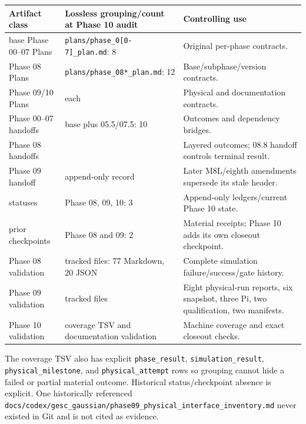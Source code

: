 \documentclass[
  10pt,
  letterpaper,
]{article}
\newcounter{none} %
\begin{document}
{\def\LTcaptype{none} %
\begin{longtable}[]{@{}
  >{\raggedright\arraybackslash}p{}
  >{\raggedleft\arraybackslash}p{}
  >{\raggedright\arraybackslash}p{}@{}}
\toprule\noalign{}
\begin{minipage}[b]{\linewidth}\raggedright
Artifact class
\end{minipage} & \begin{minipage}[b]{\linewidth}\raggedleft
Lossless grouping/count at Phase 10 audit
\end{minipage} & \begin{minipage}[b]{\linewidth}\raggedright
Controlling use
\end{minipage} \\
\midrule\noalign{}
\endhead
\bottomrule\noalign{}
\endlastfoot
base Phase 00--07 Plans & \nolinkurl{plans/phase\_0[0-7]\_plan.md}: 8 & Original per-phase contracts. \\
Phase 08 Plans & \nolinkurl{plans/phase\_08*\_plan.md}: 12 & Base/subphase/version contracts. \\
Phase 09/10 Plans & 1 each & Physical and documentation contracts. \\
Phase 00--07 handoffs & base plus 05.5/07.5: 10 & Outcomes and dependency bridges. \\
Phase 08 handoffs & 9 & Layered outcomes; 08.8 handoff controls terminal result. \\
Phase 09 handoff & 1 append-only record & Later M8L/eighth amendments supersede its stale header. \\
statuses & Phase 08, 09, 10: 3 & Append-only ledgers/current Phase 10 state. \\
prior checkpoints & Phase 08 and 09: 2 & Material receipts; Phase 10 adds its own closeout checkpoint. \\
Phase 08 validation & 97 tracked files: 77 Markdown, 20 JSON & Complete simulation failure/success/gate history. \\
Phase 09 validation & 21 tracked files & Eight physical-run reports, six snapshot, three Pi, two qualification, two manifests. \\
Phase 10 validation & coverage TSV and documentation validation & Machine coverage and exact closeout checks. \\
\end{longtable}
}

The coverage TSV also has explicit \nolinkurl{phase\_result}, \nolinkurl{simulation\_result},
\nolinkurl{physical\_milestone}, and \nolinkurl{physical\_attempt} rows so grouping cannot hide a
failed or partial material outcome. Historical status/checkpoint absence is
explicit. One historically referenced
\nolinkurl{docs/codex/gesc\_gaussian/phase09\_physical\_interface\_inventory.md} never
existed in Git and is not cited as evidence.
\end{document}
